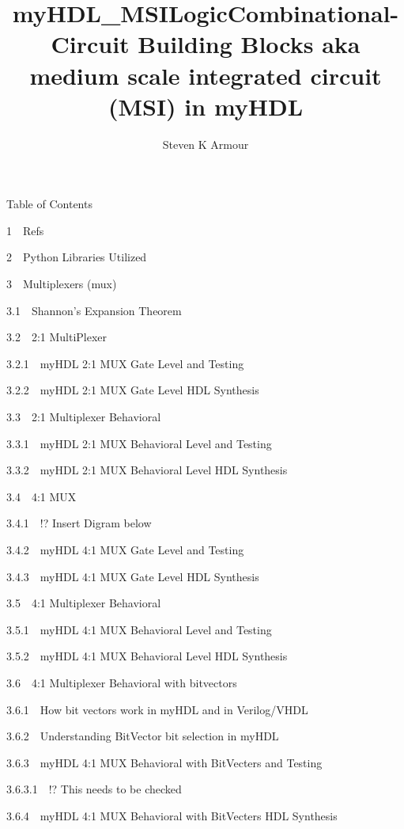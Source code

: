 \documentclass[11pt]{article}
\title{myHDL\_MSILogic}
\begin{document}
    
    
    \maketitle
    
    

    
    \title{Combinational-Circuit Building Blocks aka medium scale integrated circuit (MSI) in myHDL}\author{Steven K Armour}\maketitle

    Table of Contents{}

{{1~~}Refs}

{{2~~}Python Libraries Utilized}

{{3~~}Multiplexers (mux)}

{{3.1~~}Shannon's Expansion Theorem}

{{3.2~~}2:1 MultiPlexer}

{{3.2.1~~}myHDL 2:1 MUX Gate Level and Testing}

{{3.2.2~~}myHDL 2:1 MUX Gate Level HDL Synthesis}

{{3.3~~}2:1 Multiplexer Behavioral}

{{3.3.1~~}myHDL 2:1 MUX Behavioral Level and Testing}

{{3.3.2~~}myHDL 2:1 MUX Behavioral Level HDL Synthesis}

{{3.4~~}4:1 MUX}

{{3.4.1~~}!? Insert Digram below}

{{3.4.2~~}myHDL 4:1 MUX Gate Level and Testing}

{{3.4.3~~}myHDL 4:1 MUX Gate Level HDL Synthesis}

{{3.5~~}4:1 Multiplexer Behavioral}

{{3.5.1~~}myHDL 4:1 MUX Behavioral Level and Testing}

{{3.5.2~~}myHDL 4:1 MUX Behavioral Level HDL Synthesis}

{{3.6~~}4:1 Multiplexer Behavioral with bitvectors}

{{3.6.1~~}How bit vectors work in myHDL and in Verilog/VHDL}

{{3.6.2~~}Understanding BitVector bit selection in myHDL}

{{3.6.3~~}myHDL 4:1 MUX Behavioral with BitVecters and Testing}

{{3.6.3.1~~}!? This needs to be checked}

{{3.6.4~~}myHDL 4:1 MUX Behavioral with BitVecters HDL Synthesis}
\end{document}
